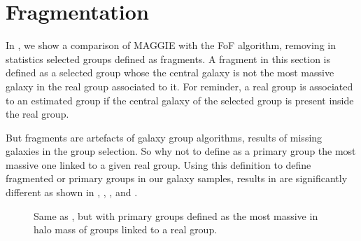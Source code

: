 \section{Fragmentation}
\label{sec:fragmentation}

In , we show a comparison of MAGGIE with the FoF
algorithm, removing in statistics selected groups defined as fragments. A
fragment in this section is defined as a selected group whose the central
galaxy is not the most massive galaxy in the real group associated to it. For
reminder, a real group is associated to an estimated group if the central
galaxy of the selected group is present inside the real group.

But fragments are artefacts of galaxy group algorithms, results of missing
galaxies in the group selection. So why not to define as a primary group the
most massive one linked to a given real group. Using this definition to define
fragmented or primary groups in our galaxy samples, results in
 are significantly different as shown
in , ,
,  and
.
%
\begin{figure}[t]
    \centering
    \begin{minipage}{0.49\linewidth}
    \end{minipage}
    \begin{minipage}{0.49\linewidth}
    \end{minipage}
    \caption{Same as , but with primary groups defined
    as the most massive in halo mass of groups linked to a real
group.\label{fig:comp_rel_fbm}}
\end{figure}

